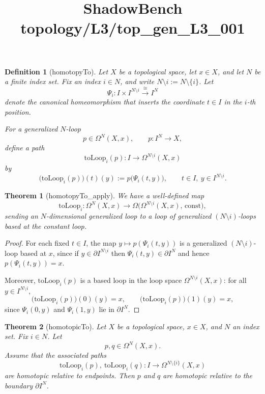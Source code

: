 \documentclass{article}
\title{ShadowBench topology/L3/top\_gen\_L3\_001}
\newtheorem{theorem}{Theorem}
\newtheorem{definition}{Definition}
\begin{document}
\maketitle

\begin{definition}[homotopyTo]
Let $X$ be a topological space, let $x \in X$, and let $N$ be a finite index set.
Fix an index $i \in N$, and write $N \setminus i := N \setminus \{i\}$.
Let
\[
\Psi_i : I \times I^{N\setminus i} \xrightarrow{\cong} I^N
\]
denote the canonical homeomorphism that inserts the coordinate $t \in I$ in the $i$-th position.

For a generalized $N$-loop
\[
p \in \Omega^{N}(X,x),
\qquad
p : I^N \to X,
\]
define a path
\[
\mathrm{toLoop}_i(p) : I \longrightarrow \Omega^{N\setminus i}(X,x)
\]
by
\[
\bigl(\mathrm{toLoop}_i(p)\bigr)(t)(y) := p\bigl(\Psi_i(t,y)\bigr),
\qquad
t \in I,\ y \in I^{N\setminus i}.
\]
\end{definition}

\begin{theorem}[homotopyTo_apply]
We have a well-defined map
\[
\mathrm{toLoop}_i :
\Omega^{N}(X,x)
\longrightarrow
\Omega\bigl(\Omega^{N\setminus i}(X,x),\,\mathrm{const}\bigr),
\]
sending an $N$-dimensional generalized loop to a loop of generalized
$(N\setminus i)$-loops based at the constant loop.
\end{theorem}
\begin{proof}
For each fixed $t \in I$, the map $y \mapsto p(\Psi_i(t,y))$ is a generalized
$(N\setminus i)$-loop based at $x$, since if $y \in \partial I^{N\setminus i}$ then
$\Psi_i(t,y) \in \partial I^N$ and hence $p(\Psi_i(t,y)) = x$.

Moreover, $\mathrm{toLoop}_i(p)$ is a based loop in the loop space
$\Omega^{N\setminus i}(X,x)$: for all $y \in I^{N\setminus i}$,
\[
\bigl(\mathrm{toLoop}_i(p)\bigr)(0)(y) = x,
\qquad
\bigl(\mathrm{toLoop}_i(p)\bigr)(1)(y) = x,
\]
since $\Psi_i(0,y)$ and $\Psi_i(1,y)$ lie in $\partial I^N$.
\end{proof}




\begin{theorem}[homotopicTo] Let $X$ be a topological space, $x\in X$, and $N$ an index set.
Fix $i\in N$.
Let
\[
p,q \in \Omega^{N}(X,x).
\]
Assume that the associated paths
\[
\mathrm{toLoop}_i(p),\ \mathrm{toLoop}_i(q) : I \longrightarrow \Omega^{N\setminus\{i\}}(X,x)
\]
are homotopic relative to endpoints.
Then $p$ and $q$ are homotopic relative to the boundary $\partial I^{N}$.
\end{theorem}
\end{document}
